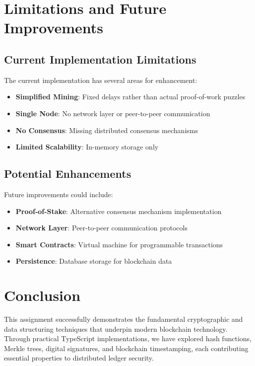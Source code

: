 \documentclass[12pt,a4paper]{article}
\begin{document}
\section{Limitations and Future Improvements}

\subsection{Current Implementation Limitations}

The current implementation has several areas for enhancement:

\begin{itemize}
    \item \textbf{Simplified Mining}: Fixed delays rather than actual proof-of-work puzzles
    \item \textbf{Single Node}: No network layer or peer-to-peer communication
    \item \textbf{No Consensus}: Missing distributed consensus mechanisms
    \item \textbf{Limited Scalability}: In-memory storage only
\end{itemize}

\subsection{Potential Enhancements}

Future improvements could include:

\begin{itemize}
    \item \textbf{Proof-of-Stake}: Alternative consensus mechanism implementation
    \item \textbf{Network Layer}: Peer-to-peer communication protocols
    \item \textbf{Smart Contracts}: Virtual machine for programmable transactions
    \item \textbf{Persistence}: Database storage for blockchain data
\end{itemize}

\section{Conclusion}

This assignment successfully demonstrates the fundamental cryptographic and data structuring techniques that underpin modern blockchain technology. Through practical TypeScript implementations, we have explored hash functions, Merkle trees, digital signatures, and blockchain timestamping, each contributing essential properties to distributed ledger security.
\end{document}
